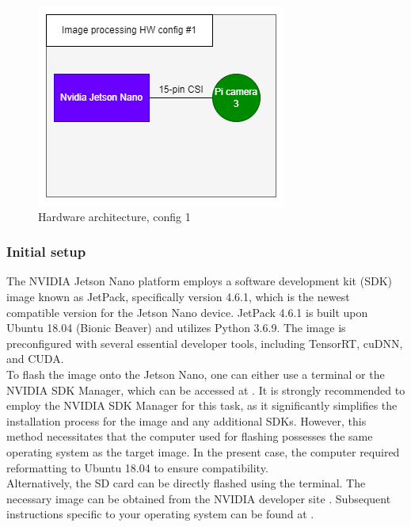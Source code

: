 \begin{figure}[!h]
    \centering
    \includegraphics[scale=0.5]{fig/config1_hw.png}
    \caption{Hardware architecture, config 1}
    \label{fig:config1_hw}
\end{figure}


\subsubsection{Initial setup}

The NVIDIA Jetson Nano platform employs a software development kit (SDK) image known as JetPack, specifically version 4.6.1, which is the newest compatible version for the Jetson Nano device. JetPack 4.6.1 is built upon Ubuntu 18.04 (Bionic Beaver) and utilizes Python 3.6.9. The image is preconfigured with several essential developer tools, including TensorRT, cuDNN, and CUDA.\\

To flash the image onto the Jetson Nano, one can either use a terminal or the NVIDIA SDK Manager, which can be accessed at \cite{Jetson_sdk_manager}. It is strongly recommended to employ the NVIDIA SDK Manager for this task, as it significantly simplifies the installation process for the image and any additional SDKs. However, this method necessitates that the computer used for flashing possesses the same operating system as the target image. In the present case, the computer required reformatting to Ubuntu 18.04 to ensure compatibility.\\



Alternatively, the SD card can be directly flashed using the terminal. The necessary image can be obtained from the NVIDIA developer site \cite{Jetpack_461}. Subsequent instructions specific to your operating system can be found at \cite{Jetpack_461_write_to_sd}.\\

